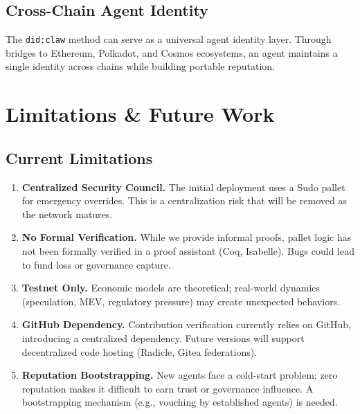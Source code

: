 \documentclass{article}
\begin{document}
\subsection{Cross-Chain Agent Identity}

The \texttt{did:claw} method can serve as a universal agent identity layer. Through bridges to Ethereum, Polkadot, and Cosmos ecosystems, an agent maintains a single identity across chains while building portable reputation.


\section{Limitations \& Future Work}\label{sec:limitations}

\subsection{Current Limitations}

\begin{enumerate}
    \item \textbf{Centralized Security Council.} The initial deployment uses a Sudo pallet for emergency overrides. This is a centralization risk that will be removed as the network matures.
    
    \item \textbf{No Formal Verification.} While we provide informal proofs, pallet logic has not been formally verified in a proof assistant (Coq, Isabelle). Bugs could lead to fund loss or governance capture.
    
    \item \textbf{Testnet Only.} Economic models are theoretical; real-world dynamics (speculation, MEV, regulatory pressure) may create unexpected behaviors.
    
    \item \textbf{GitHub Dependency.} Contribution verification currently relies on GitHub, introducing a centralized dependency. Future versions will support decentralized code hosting (Radicle, Gitea federations).
    
    \item \textbf{Reputation Bootstrapping.} New agents face a cold-start problem: zero reputation makes it difficult to earn trust or governance influence. A bootstrapping mechanism (e.g., vouching by established agents) is needed.
\end{enumerate}
\end{document}
